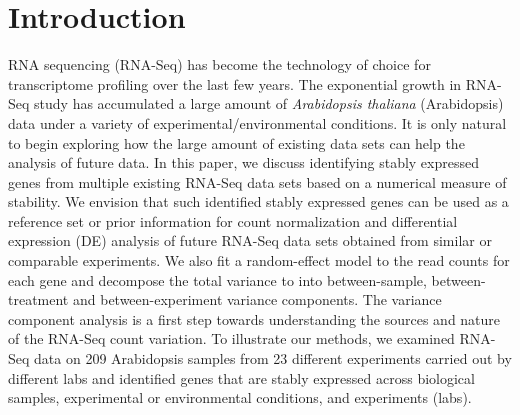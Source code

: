 \documentclass[letterpaper,12pt]{article}
\begin{document}

\section{Introduction}\label{section:Introduction}

RNA sequencing (RNA-Seq) has become the technology of choice for transcriptome
profiling over the last few years. The exponential growth in RNA-Seq study has
accumulated a large amount of \textit{Arabidopsis thaliana} (Arabidopsis) data under a variety of experimental/environmental conditions.  It is only natural to begin exploring
how the large amount of existing data sets can help the analysis of future
data.  In this paper, we discuss identifying stably expressed genes from
multiple existing RNA-Seq data sets based on a numerical measure of stability.
We envision that such identified stably expressed genes can be used as a
reference set or prior information for count normalization and differential
expression (DE) analysis of future RNA-Seq data sets obtained from similar or
comparable experiments.  We also fit a random-effect model to the read counts
for each gene and decompose the total variance to into between-sample,
between-treatment and between-experiment variance components. The variance component
analysis is a first step towards understanding the sources and nature of the
RNA-Seq count variation.  To illustrate our methods, we examined RNA-Seq data
on 209 Arabidopsis  samples from 23 different experiments carried out by
different labs and identified genes that are stably expressed across
biological samples, experimental or environmental conditions, and experiments
(labs).  
\end{document}
